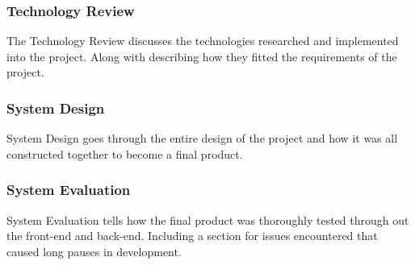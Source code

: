 \subsubsection{Technology Review}
The Technology Review discusses the technologies researched and implemented into the project. Along with describing how they fitted the requirements of the project.

\subsubsection{System Design}
System Design goes through the entire design of the project and how it was all constructed together to become a final product.

\subsubsection{System Evaluation}
System Evaluation tells how the final product was thoroughly tested through out the front-end and back-end. Including a section for issues encountered that caused long pauses in development.
